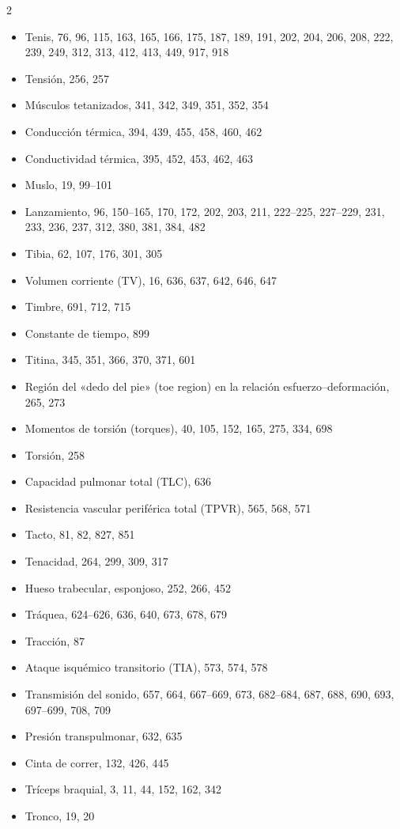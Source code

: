 \documentclass[12pt,a4paper]{book}
\begin{document}
\begin{multicols}{2}
\begin{itemize}[leftmargin=*]
  \item Tenis, 76, 96, 115, 163, 165, 166, 175, 187, 189, 191, 202, 204, 206, 208, 222, 239, 249, 312, 313, 412, 413, 449, 917, 918
  \item Tensión, 256, 257
  \item Músculos tetanizados, 341, 342, 349, 351, 352, 354
  \item Conducción térmica, 394, 439, 455, 458, 460, 462
  \item Conductividad térmica, 395, 452, 453, 462, 463
  \item Muslo, 19, 99--101
  \item Lanzamiento, 96, 150--165, 170, 172, 202, 203, 211, 222--225, 227--229, 231, 233, 236, 237, 312, 380, 381, 384, 482
  \item Tibia, 62, 107, 176, 301, 305
  \item Volumen corriente (TV), 16, 636, 637, 642, 646, 647
  \item Timbre, 691, 712, 715
  \item Constante de tiempo, 899
  \item Titina, 345, 351, 366, 370, 371, 601
  \item Región del «dedo del pie» (toe region) en la relación esfuerzo--deformación, 265, 273
  \item Momentos de torsión (torques), 40, 105, 152, 165, 275, 334, 698
  \item Torsión, 258
  \item Capacidad pulmonar total (TLC), 636
  \item Resistencia vascular periférica total (TPVR), 565, 568, 571
  \item Tacto, 81, 82, 827, 851
  \item Tenacidad, 264, 299, 309, 317
  \item Hueso trabecular, esponjoso, 252, 266, 452
  \item Tráquea, 624--626, 636, 640, 673, 678, 679
  \item Tracción, 87
  \item Ataque isquémico transitorio (TIA), 573, 574, 578
  \item Transmisión del sonido, 657, 664, 667--669, 673, 682--684, 687, 688, 690, 693, 697--699, 708, 709
  \item Presión transpulmonar, 632, 635
  \item Cinta de correr, 132, 426, 445
  \item Tríceps braquial, 3, 11, 44, 152, 162, 342
  \item Tronco, 19, 20

\end{itemize}
\end{multicols}
\end{document}
